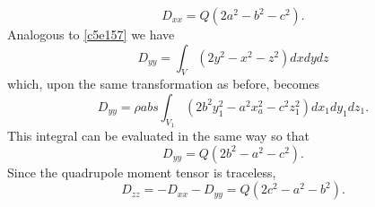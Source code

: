 \begin{enumerate}
\begin{equation}
D_{xx} = Q(2a^2-b^2-c^2).
\end{equation}
Analogous to \eqref{c5e157} we have
\begin{equation}\label{c5e160}
D_{yy} = \int_V(2y^2 - x^2 - z^2)dxdydz
\end{equation}
which, upon the same transformation as before, becomes
\[
D_{yy} = \rho abs\int_{V_1}(2b^2y_1^2 - a^2x_a^2 - c^2z_1^2)dx_1dy_1dz_1.
\]
This integral can be evaluated in the same way so that
\begin{equation}\label{c5e151}
D_{yy} = Q(2b^2 - a^2 - c^2).
\end{equation}
Since the quadrupole moment tensor is traceless,
\begin{equation}\label{c5e162}
D_{zz} = -D_{xx} - D_{yy} = Q(2c^2 - a^2 - b^2).
\end{equation}
\end{enumerate}